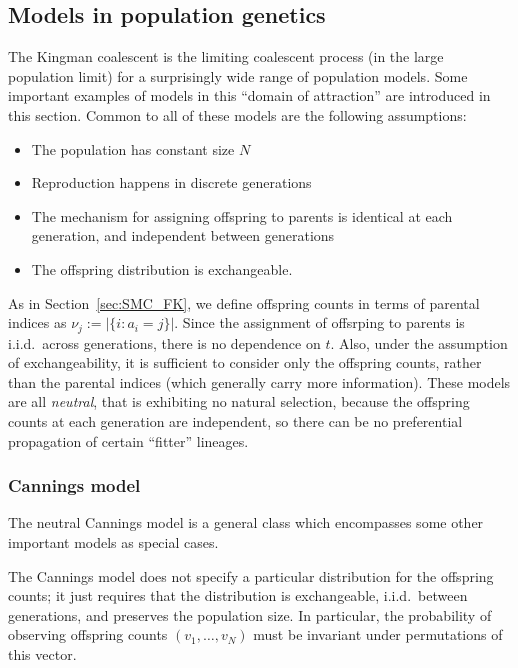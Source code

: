 \subsection{Models in population genetics}\label{sec:popgenmodels}
The Kingman coalescent is the limiting coalescent process (in the large population limit) for a surprisingly wide range of population models. Some important examples of models in this ``domain of attraction'' are introduced in this section.
Common to all of these models are the following assumptions:
\begin{itemize}
\item The population has constant size $N$
\item Reproduction happens in discrete generations
\item The mechanism for assigning offspring to parents is identical at each generation, and independent between generations
\item The offspring distribution is exchangeable.
\end{itemize}
As in Section~\ref{sec:SMC_FK}, we define offspring counts in terms of parental indices as $\nu_j := |\{ i: a_i = j\}|$.
Since the assignment of offsrping to parents is i.i.d.\ across generations, there is no dependence on $t$.
Also, under the assumption of exchangeability, it is sufficient to consider only the offspring counts, rather than the parental indices (which generally carry more information).
These models are all \emph{neutral}, that is exhibiting no natural selection, because the offspring counts at each generation are independent, so there can be no preferential propagation of certain ``fitter'' lineages.




\subsubsection{Cannings model}
The neutral Cannings model \parencite{cannings1974, cannings1975} is a general class which encompasses some other important models as special cases.

The Cannings model does not specify a particular distribution for the offspring counts; it just requires that the distribution is exchangeable, i.i.d.\ between generations, and preserves the population size. In particular, the probability of observing offspring counts $(v_1, \dots, v_N)$ must be invariant under permutations of this vector.


